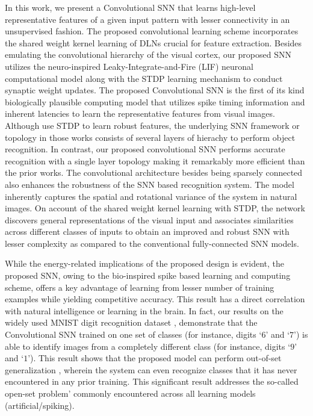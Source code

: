 \documentclass[journal, onecolumn]{IEEEtran}
\begin{document}
In this work, we present a Convolutional SNN that learns high-level representative features of a given input pattern with lesser connectivity in an unsupervised fashion. The proposed convolutional learning scheme incorporates the shared weight kernel learning of DLNs  crucial for feature extraction. Besides emulating the convolutional hierarchy of the visual cortex, our proposed SNN utilizes the neuro-inspired Leaky-Integrate-and-Fire (LIF) neuronal computational model along with the STDP learning mechanism to conduct synaptic weight updates. The proposed Convolutional SNN is the first of its kind biologically plausible computing model that utilizes spike timing information and inherent latencies to learn the representative features from visual images. Although \cite{masquelier2007unsupervised, kheradpisheh2016stdp, kheradpisheh2016bio} use STDP to learn robust features, the underlying SNN framework or topology in those works consists of several layers of hierachy to perform object recognition. In contrast, our proposed convolutional SNN performs accurate recognition with a single layer topology making it remarkably more efficient than the prior works. The convolutional architecture besides being sparsely connected also enhances the robustness of the SNN based recognition system. The model inherently captures the spatial and rotational variance of the system in natural images. On account of the shared weight kernel learning with STDP, the network discovers general representations of the visual input and associates similarities across different classes of inputs to obtain an improved and robust SNN with lesser complexity as compared to the conventional fully-connected SNN models.

While the energy-related implications of the proposed design is evident, the proposed SNN, owing to the bio-inspired spike based learning and computing scheme, offers a key advantage of learning from lesser number of training examples while yielding competitive accuracy. This result has a direct correlation with natural intelligence or learning in the brain. In fact, our results on the widely used MNIST digit recognition dataset \cite{lecun1998mnist}, demonstrate that the Convolutional SNN trained on one set of classes (for instance, digits `$6$' and `$7$') is able to identify images from a  completely different class (for instance, digits `$9$' and `$1$'). This result shows that the proposed model can perform out-of-set generalization \cite{cox2014neural}, wherein the system can even recognize classes that it has never encountered in any prior training. This significant result addresses the so-called open-set problem’ \cite{scheirer2014probability, dean2013fast} commonly encountered across all learning models (artificial/spiking).
\end{document}
